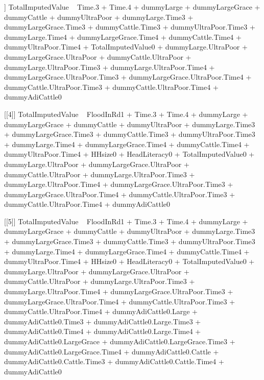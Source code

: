 \begin{Schunk}
\begin{Soutput}
[[3]]
TotalImputedValue ~ Time.3 + Time.4 + dummyLarge + dummyLargeGrace + 
    dummyCattle + dummyUltraPoor + dummyLarge.Time3 + dummyLargeGrace.Time3 + 
    dummyCattle.Time3 + dummyUltraPoor.Time3 + dummyLarge.Time4 + 
    dummyLargeGrace.Time4 + dummyCattle.Time4 + dummyUltraPoor.Time4 + 
    TotalImputedValue0 + dummyLarge.UltraPoor + dummyLargeGrace.UltraPoor + 
    dummyCattle.UltraPoor + dummyLarge.UltraPoor.Time3 + dummyLarge.UltraPoor.Time4 + 
    dummyLargeGrace.UltraPoor.Time3 + dummyLargeGrace.UltraPoor.Time4 + 
    dummyCattle.UltraPoor.Time3 + dummyCattle.UltraPoor.Time4 + 
    dummyAdiCattle0

[[4]]
TotalImputedValue ~ FloodInRd1 + Time.3 + Time.4 + dummyLarge + 
    dummyLargeGrace + dummyCattle + dummyUltraPoor + dummyLarge.Time3 + 
    dummyLargeGrace.Time3 + dummyCattle.Time3 + dummyUltraPoor.Time3 + 
    dummyLarge.Time4 + dummyLargeGrace.Time4 + dummyCattle.Time4 + 
    dummyUltraPoor.Time4 + HHsize0 + HeadLiteracy0 + TotalImputedValue0 + 
    dummyLarge.UltraPoor + dummyLargeGrace.UltraPoor + dummyCattle.UltraPoor + 
    dummyLarge.UltraPoor.Time3 + dummyLarge.UltraPoor.Time4 + 
    dummyLargeGrace.UltraPoor.Time3 + dummyLargeGrace.UltraPoor.Time4 + 
    dummyCattle.UltraPoor.Time3 + dummyCattle.UltraPoor.Time4 + 
    dummyAdiCattle0

[[5]]
TotalImputedValue ~ FloodInRd1 + Time.3 + Time.4 + dummyLarge + 
    dummyLargeGrace + dummyCattle + dummyUltraPoor + dummyLarge.Time3 + 
    dummyLargeGrace.Time3 + dummyCattle.Time3 + dummyUltraPoor.Time3 + 
    dummyLarge.Time4 + dummyLargeGrace.Time4 + dummyCattle.Time4 + 
    dummyUltraPoor.Time4 + HHsize0 + HeadLiteracy0 + TotalImputedValue0 + 
    dummyLarge.UltraPoor + dummyLargeGrace.UltraPoor + dummyCattle.UltraPoor + 
    dummyLarge.UltraPoor.Time3 + dummyLarge.UltraPoor.Time4 + 
    dummyLargeGrace.UltraPoor.Time3 + dummyLargeGrace.UltraPoor.Time4 + 
    dummyCattle.UltraPoor.Time3 + dummyCattle.UltraPoor.Time4 + 
    dummyAdiCattle0.Large + dummyAdiCattle0.Time3 + dummyAdiCattle0.Large.Time3 + 
    dummyAdiCattle0.Time4 + dummyAdiCattle0.Large.Time4 + dummyAdiCattle0.LargeGrace + 
    dummyAdiCattle0.LargeGrace.Time3 + dummyAdiCattle0.LargeGrace.Time4 + 
    dummyAdiCattle0.Cattle + dummyAdiCattle0.Cattle.Time3 + dummyAdiCattle0.Cattle.Time4 + 
    dummyAdiCattle0


\end{Soutput}
\end{Schunk}
